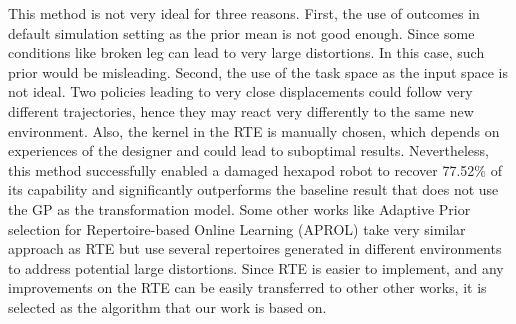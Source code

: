 \documentclass[journal]{IEEEtran}
\begin{document}
This method is not very ideal for three reasons. 
First, the use of outcomes in default simulation setting as the prior mean is not good enough. Since some conditions like broken leg can lead to very large distortions. In this case, such prior would be misleading. 
Second, the use of the task space as the input space is not ideal. Two policies leading to very close displacements could follow very different trajectories, hence they may react very differently to the same new environment.
Also, the kernel in the RTE is manually chosen, which depends on experiences of the designer and could lead to suboptimal results.
Nevertheless, this method successfully enabled a damaged hexapod robot to recover 77.52\% of its capability \cite{RTE} and significantly outperforms the baseline result that does not use the GP as the transformation model.
Some other works like Adaptive Prior selection for Repertoire-based Online Learning \cite{APROL} (APROL) take very similar approach as RTE but use several repertoires generated in different environments to address potential large distortions. 
Since RTE is easier to implement, and any improvements on the RTE can be easily transferred to other other works, it is selected as the algorithm that our work is based on.
\end{document}
